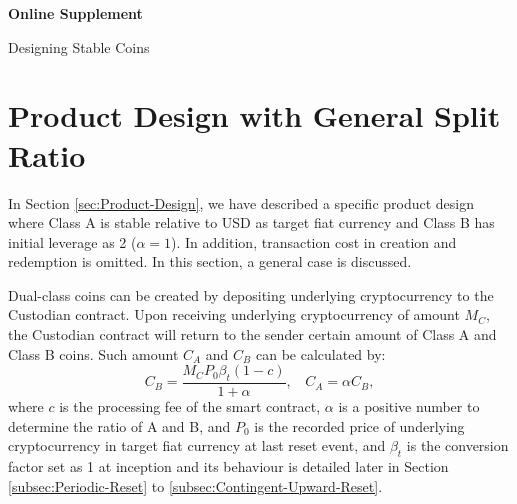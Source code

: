 \documentclass[11pt]{article}%
\numberwithin{equation}{section}
\theoremstyle{plain}
\begin{document}
\begin{appendices}



%



\begin{center}
{\Large \bf  Online Supplement}

\medskip

{\Large Designing Stable Coins}

\end{center}









\section{Product Design with General Split Ratio}
\label{subsec:General-Product-Design}


In Section \ref{sec:Product-Design}, we have described a specific product design where Class A is stable relative to USD as target fiat currency and Class B has initial leverage as 2 ($\alpha=1$). In addition, transaction cost in creation and redemption is omitted. In this section, a general case is discussed.


Dual-class coins can be created by depositing underlying cryptocurrency to the Custodian contract. Upon receiving underlying cryptocurrency of amount $M_{C}$, the Custodian contract will return to the sender certain amount of Class A and Class B coins. Such amount $C_{A}$ and $C_{B}$ can be calculated by:
\begin{equation}
C_{B}=  \frac{M_{C} P_{0}\beta_t\left(1-c\right)}{1+\alpha},~~~~
C_{A}=  \alpha C_{B},
\label{eq:creation-1}
\end{equation}
where $c$ is the processing fee of the smart contract, $\alpha$ is a positive number to determine the ratio of A and B, and $P_{0}$ is the recorded price of underlying cryptocurrency in target fiat currency at last reset event, and $\beta_t$ is the conversion factor set as 1 at inception and its behaviour is detailed later in Section \ref{subsec:Periodic-Reset} to \ref{subsec:Contingent-Upward-Reset}.


\end{appendices}
\end{document}
